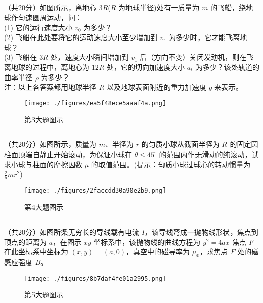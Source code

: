 \subsection{ }
（共20分）如图所示，离地心 $3R$($R$ 为地球半径)处有一质量为 $m$ 的飞船，绕地球作匀速圆周运动，问：\\
(1) 它的运行速度大小 $v_{0}$ 为多少？\\
(2) 飞船在此处要将它的运动速度大小至少增加到 $v_{1}$ 为多少时，它才能飞离地球？\\
(3) 飞船在 $3R$ 处，速度大小瞬间增加到 $v_{1}$ 后（方向不变）关闭发动机，则在飞离地球的过程中，离地心为 $12R$ 处，它的切向加速度大小 $a_{t}$ 为多少？该处轨道的曲率半径 $\rho$ 为多少？\\
注：以上各答案都用地球半径 $R$ 以及地球表面附近的重力加速度 $g$ 来表示。\\
\begin{figure}[ht]
\centering
\texttt{[image: ./figures/ea5f48ece5aaaf4a.png]}
\caption{第3大题图示} \label{fig_CAS20_1}
\end{figure}

\subsection{ }
（共20分）如图所示，质量为 $m$、半径为 $r$ 的匀质小球从截面半径为 $R$ 的固定圆柱面顶端自静止开始滚动，为保证小球在 $\theta \le 45^{\circ}$ 的范围内作无滑动的纯滚动，试求小球与柱面的摩擦因数 $\mu$ 的取值范围。(提示：匀质小球过球心的转动惯量为 $\frac{2}{5} mr^{2}$)\\
\begin{figure}[ht]
\centering
\texttt{[image: ./figures/2faccdd30a90e2b9.png]}
\caption{第4大题图示} \label{fig_CAS20_2}
\end{figure}

\subsection{ }
（共20分）如图所条无穷长的导线载有电流 $I$，该导线弯成一抛物线形状，焦点到顶点的距离为 $a$，在图示 $xy$ 坐标系中，该抛物线的曲线方程为 $y^{2}=4ax$ 焦点 $F$ 在此坐标系中坐标为 $(x,y)=(a,0)$，真空中的磁导率为 $\mu_{0}$，求焦点 $F$ 处的磁感应强度 $B$。\\
\begin{figure}[ht]
\centering
\texttt{[image: ./figures/8b7daf4fe01a2995.png]}
\caption{第5大题图示} \label{fig_CAS20_3}
\end{figure}


